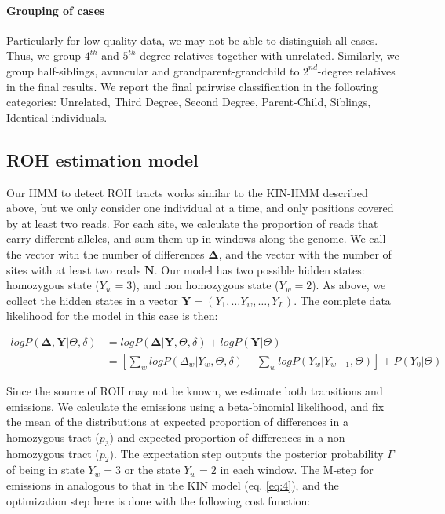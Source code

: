 \documentclass[12pt, letterpaper]{article}
\begin{document}
\paragraph{Grouping of cases}
Particularly for low-quality data, we may not be able to distinguish all cases. Thus, we group $4^{th}$ and $5^{th}$ degree relatives together with unrelated.  Similarly, we group  half-siblings, avuncular and grandparent-grandchild to  $2^{nd}$-degree relatives in the final results. We report the final pairwise classification in the following categories: Unrelated, Third Degree, Second Degree, Parent-Child, Siblings, Identical individuals.


\subsection{ROH estimation model}\label{roh}
Our HMM to detect ROH tracts works similar to the KIN-HMM described above, but we only consider one individual at a time, and only positions covered by at least two reads. For each site, we calculate the proportion of reads that carry different alleles, and sum them up in windows along the genome. We call the vector with the number of differences $\mathbf{\Delta}$, and the vector with the number of sites with at least two reads $\mathbf{N}$. Our model has two possible hidden states: homozygous state ($Y_w=3$), and non homozygous state ($Y_w=2$). As above, we collect the hidden states in a vector $\mathbf{Y} = (Y_1, \dots Y_w, \dots, Y_L)$. The complete data likelihood for the model in this case is then:

\begin{align}\label{eq:10}
    log P(\mathbf{\Delta},\mathbf{Y}|\Theta,\delta) &= log P(\mathbf{\Delta}|\mathbf{Y},\Theta, \delta) + log P(\mathbf{Y}|\Theta)\nonumber\\
 &= [\sum_{w} log P(\Delta_w|Y_w, \Theta, \delta) + \sum_{w} log P(Y_w|Y_{w-1}, \Theta)] + P(Y_0| \Theta)
\end{align}

Since the source of ROH may not be known,  we estimate both transitions and emissions. We calculate the emissions using a beta-binomial likelihood, and fix the mean of the distributions at expected proportion of differences in a homozygous tract ($p_3$) and expected proportion of differences in a non-homozygous tract ($p_2$). The expectation step outputs the posterior probability $\Gamma$ of being in state $Y_w=3$ or the state $Y_w=2$ in each window. The M-step for emissions in analogous to that in the KIN model (eq. \ref{eq:4}), and the optimization step here is done with the following cost function:
\end{document}
